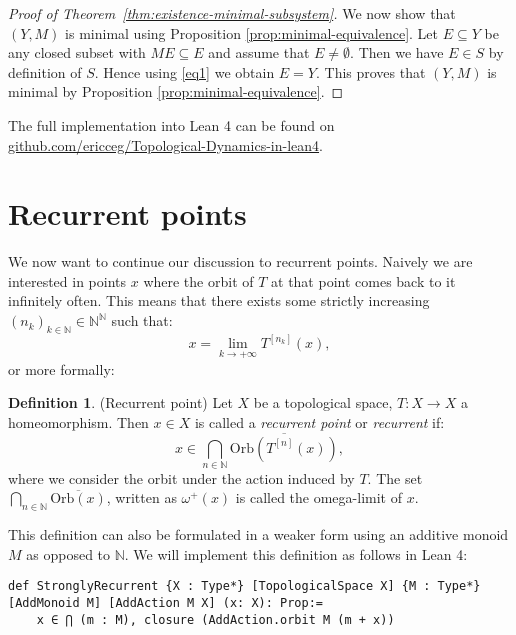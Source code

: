 \documentclass[11pt]{article}
\theoremstyle{definition}              %
\newtheorem{definition}[theorem]{Definition}
\theoremstyle{definition}              %
\theoremstyle{definition}              %
\begin{document}
\begin{proof}[Proof of Theorem~\ref{thm:existence-minimal-subsystem}]
We now show that $(Y, M)$ is minimal using Proposition \ref{prop:minimal-equivalence}. 
Let $E \subseteq Y$ be any closed subset with $M E \subseteq E$ and assume that $E \neq \emptyset$. 
Then we have $E \in S$ by definition of $S$. Hence using \eqref{eq1} we obtain $E = Y$. 
This proves that $(Y, M)$ is minimal by Proposition \ref{prop:minimal-equivalence}.
\end{proof}

The full implementation into Lean 4 can be found on \href{https://github.com/ericceg/Topological-Dynamics-in-lean4/blob/master/Project/Theorem.lean}{github.com/ericceg/Topological-Dynamics-in-lean4}.



\pagebreak
\section{Recurrent points}\label{recurrentpoints}
We now want to continue our discussion to recurrent points. Naively we are interested in points $x$ where the orbit of $T$ at that point comes back to it infinitely often. This means that there exists some strictly increasing $(n_k)_{k \in \mathbb{N}} \in \mathbb{N}^\mathbb{N}$ such that:
\begin{equation}
    x=\lim_{k \to +\infty} T^{[n_k]}(x),
\end{equation}
or more formally:

\begin{definition}(Recurrent point)
    Let $X$ be a topological space, $T:X \to X$ a homeomorphism. Then $x \in X$ is called a \emph{recurrent point} or \emph{recurrent} if:
    \begin{equation}
        x \in \bigcap_{n \in \mathbb{N}} \overline{\text{Orb}(T^{[n]}(x))},
    \end{equation}
    where we consider the orbit under the action induced by $T$. The set $\bigcap_{n \in \mathbb{N}} \overline{\text{Orb}(x)}$, written as $\omega^+(x)$ is called the omega-limit of $x$.
\end{definition}

This definition can also be formulated in a weaker form using an additive monoid $M$ as opposed to $\mathbb{N}$. We will implement this definition as follows in Lean 4:

\begin{lstlisting}
def StronglyRecurrent {X : Type*} [TopologicalSpace X] {M : Type*} [AddMonoid M] [AddAction M X] (x: X): Prop:=
    x ∈ ⋂ (m : M), closure (AddAction.orbit M (m + x))
\end{lstlisting}
\end{document}
